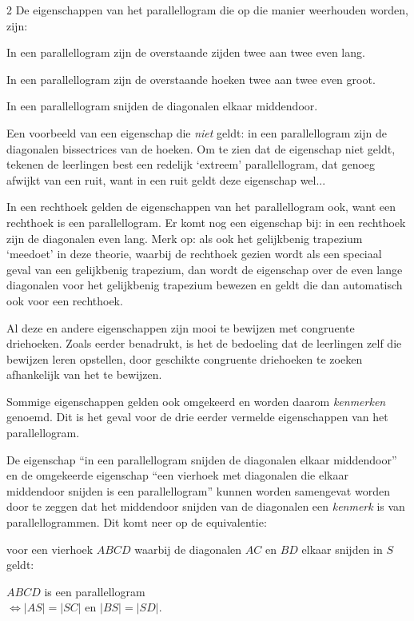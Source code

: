 \begin{multicols}{2}
De eigenschappen van het parallellogram die op die manier weerhouden worden, zijn:
\begin{opsomming}
\item In een parallellogram zijn de overstaande zijden twee aan twee even lang.
\item In een parallellogram zijn de overstaande hoeken twee aan twee even groot.
\item In een parallellogram snijden de diagonalen elkaar middendoor.
\end{opsomming}

Een voorbeeld van een eigenschap die \emph{niet} geldt: in een parallellogram zijn de diagonalen bissectrices van de hoeken. Om te zien dat de eigenschap niet geldt, tekenen de leerlingen best een redelijk `extreem' parallellogram, dat genoeg afwijkt van een ruit, want in een ruit geldt deze eigenschap wel... 

In een rechthoek gelden de eigenschappen van het parallellogram ook, want een rechthoek is een parallellogram. Er komt nog een eigenschap bij: in een rechthoek zijn de diagonalen even lang. Merk op: als ook het gelijkbenig trapezium `meedoet' in deze theorie, waarbij de rechthoek gezien wordt als een speciaal geval van een gelijkbenig trapezium, dan wordt de eigenschap over de even lange diagonalen voor het gelijkbenig trapezium bewezen en geldt die dan automatisch ook voor een rechthoek.

Al deze en andere eigenschappen zijn mooi te bewijzen met congruente driehoeken. Zoals eerder benadrukt, is het de bedoeling dat de leerlingen zelf die bewijzen leren opstellen, door geschikte congruente driehoeken te zoeken afhankelijk van het te bewijzen.

Sommige eigenschappen gelden ook omgekeerd en worden daarom \emph{kenmerken} genoemd. Dit is het geval voor de drie eerder vermelde eigenschappen van het parallellogram. 

De eigenschap ``in een parallellogram snijden de diagonalen elkaar middendoor'' en de omgekeerde eigenschap ``een vierhoek met diagonalen die elkaar middendoor snijden is een parallellogram'' kunnen worden samengevat worden door te zeggen dat het middendoor snijden van de diagonalen een \emph{kenmerk} is van parallellogrammen. Dit komt neer op de equivalentie: 

voor een vierhoek $ABCD$ waarbij de diagonalen $AC$ en $BD$ elkaar snijden in $S$ geldt:

\begin{center}
$ABCD$ is een parallellogram \\
$\Leftrightarrow |AS|=|SC|$ en $|BS|=|SD|$.
\end{center}


\end{multicols}
